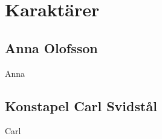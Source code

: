 \section{Karaktärer}
\subsection{Anna Olofsson}
\label{kar:AnnaOlofsson}
Anna
\subsection{Konstapel Carl Svidstål}
\label{kar:KonstapelCarlSvidstal}
Carl
